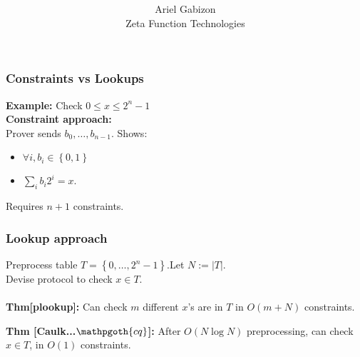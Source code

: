 \documentclass[shadesubsections,compress,14pt,mathserif]{beamer}
\title{ \bf \papertitle \\[0.72cm]}
\author{Ariel Gabizon \\
Zeta Function Technologies}
\newcommand{\set}[1]{\ensuremath{\left\{#1\right\}}}
\newcommand{\nl}{\\ \pause \vspace{0.2in}}
\newcommand{\cq}{\mathpgoth{cq} }
\begin{document}
\boldmath
\begin{frame}
  \titlepage
\end{frame}
\begin{frame}
\frametitle{Constraints vs Lookups}
\textbf{Example:} Check $0\leq x \leq 2^n-1$\nl
\textbf{Constraint approach:}\\
Prover sends $b_0,\ldots,b_{n-1}$. Shows:
\begin{itemize}
 \item 
$\forall i, b_i\in \set{0,1}$
\item
$\sum_{i} b_i2^i =x$.\nl
\end{itemize}
Requires $n+1$ constraints.

\end{frame}
\begin{frame}
\frametitle{Lookup approach}
Preprocess table $T=\set{0,\ldots,2^n-1}$.Let $N:=|T|$. \\ \noindent 
Devise protocol to check $x\in T$.\nl
\textit{\color{blue}{Old results - good when amortized:}}\\ \noindent
\noindent
\textbf{Thm[plookup]:}  Can check $m$ different $x$'s are in $T$ in $O(m+ N)$
 constraints.\nl

\textit{\color{blue}{New results - prover doesn't pay for table size!!\\}}
\textbf{Thm [Caulk...$\cq$]:} After $O(N\log N)$ preprocessing, can check $x\in T$, in $O(1)$ constraints. 
\end{frame}
\end{document}
